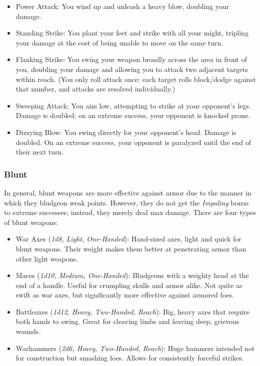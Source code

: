 \documentclass[12pt]{book}
\begin{document}
\begin{itemize}
	\item Power Attack: You wind up and unleash a heavy blow, doubling your damage.
	\item Standing Strike: You plant your feet and strike with all your might, tripling your damage at the cost of being unable to move on the same turn.
	\item Flanking Strike: You swing your weapon broadly across the area in front of you, doubling your damage and allowing you to attack two adjacent targets within reach. (You only roll attack once; each target rolls block/dodge against that number, and attacks are resolved individually.)
	\item Sweeping Attack: You aim low, attempting to strike at your opponent's legs. Damage is doubled; on an extreme success, your opponent is knocked prone.
	\item Dizzying Blow: You swing directly for your opponent's head. Damage is doubled. On an extreme success, your opponent is paralyzed until the end of their next turn.
\end{itemize}

\subsubsection{Blunt}

In general, blunt weapons are more effective against armor due to the manner in which they bludgeon weak points. However, they do not get the \textit{Impaling} bonus to extreme successes; instead, they merely deal max damage. There are four types of blunt weapons:

\begin{itemize}
	\item War Axes (\textit{1d8, Light, One-Handed}): Hand-sized axes, light and quick for blunt weapons. Their weight makes them better at penetrating armor than other light weapons.
	\item Maces (\textit{1d10, Medium, One-Handed}): Bludgeons with a weighty head at the end of a handle. Useful for crumpling skulls and armor alike. Not quite as swift as war axes, but significantly more effective against armored foes.
	\item Battleaxes (\textit{1d12, Heavy, Two-Handed, Reach}): Big, heavy axes that require both hands to swing. Great for cleaving limbs and leaving deep,  grievous wounds.
	\item Warhammers (\textit{2d6, Heavy, Two-Handed, Reach}): Huge hammers intended not for construction but smashing foes. Allows for consistently forceful strikes.
\end{itemize}
\end{document}
